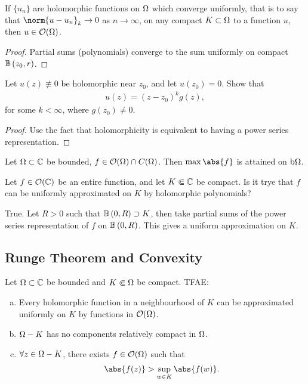 \begin{corollary}
    If $\{ u_n \} $ are holomorphic functions on $\Omega$ which converge uniformly, that is to say that $\norm{u - u_n}_k \to 0$ as $n \to \infty$, on any compact $K \subset \Omega$ to a function $u$, then $u \in \mathcal{O}(\Omega)$.
\end{corollary}

\begin{proof}
    Partial sums (polynomials) converge to the sum uniformly on compact $\ball{z_0}{r}$.
\end{proof}

\begin{exercise}
Let $u(z) \not\equiv 0$ be holomorphic near $z_0$, and let $u(z_0) = 0$. Show that
\begin{align*}
    u(z) = (z-z_0)^k g(z),
\end{align*}
for some $k < \infty$, where $g(z_0) \neq 0$.
\end{exercise}

\begin{proof}
    Use the fact that holomorphicity is equivalent to having a power series representation.
\end{proof}

\begin{theorem}
    Let $\Omega \subset \mathbb{C}$ be bounded, $f \in \mathcal{O}(\Omega) \cap C(\Omega)$. Then $\max \abs{f} $ is attained on $\operatorname{b}\! \Omega$.
\end{theorem}

\begin{quizques}
    Let $f \in \mathcal{O} (\mathbb{C}) $ be an entire function, and let $K \Subset \mathbb{C}$ be compact. Is it trye that $f$ can be uniformly approximated on $K$ by holomorphic polynomials?
\end{quizques}

\begin{quizans}
    True. Let $R > 0$ such that $\ball{0}{R} \supset K$, then take partial sums of the power series representation of $f$ on $\ball{0}{R}$. This gives a uniform approximation on $K$.
\end{quizans}

\subsection{Runge Theorem and Convexity}
\begin{theorem}
    Let $\Omega \subset \mathbb{C}$ be bounded and $K \Subset \Omega$ be compact. TFAE:
    \begin{enumerate}[a)]
        \item Every holomorphic function in a neighbourhood of $K$ can be approximated uniformly on $K$ by functions in $\mathcal{O} (\Omega)$.
        \item $\Omega - K$ has no components relatively compact in $\Omega$.
        \item $\forall z \in \Omega - K$, there exists $f \in \mathcal{O}(\Omega)$ such that
        \begin{align*}
            \abs{f(z)} > \sup_{w \in K} \abs{f(w)}.
        \end{align*}
    \end{enumerate}
\end{theorem}

